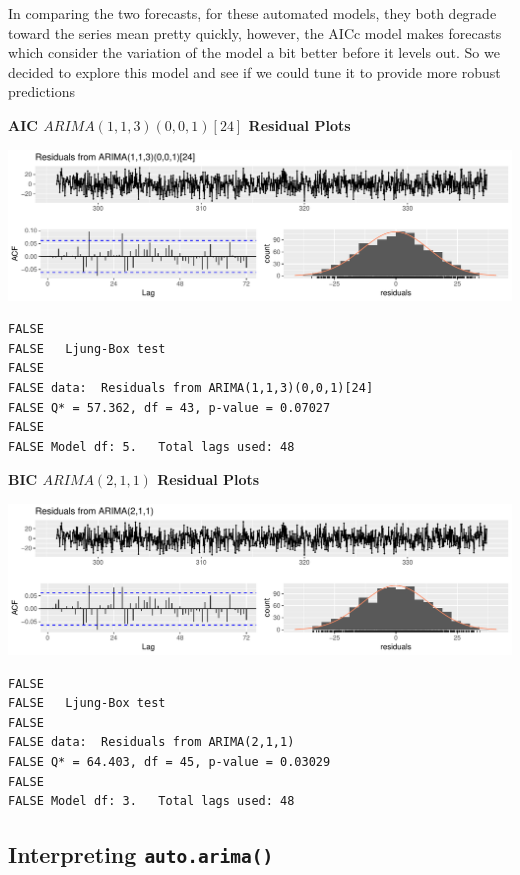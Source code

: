\documentclass[openany]{book}
\begin{document}
In comparing the two forecasts, for these automated models, they both
degrade toward the series mean pretty quickly, however, the AICc model
makes forecasts which consider the variation of the model a bit better
before it levels out. So we decided to explore this model and see if we
could tune it to provide more robust predictions

\textbf{AIC \(ARIMA(1,1,3)(0,0,1)[24]\) Residual Plots}

\includegraphics{Group2_Project1_Fall2019_files/figure-latex/unnamed-chunk-20-1.pdf}

\begin{verbatim}
FALSE 
FALSE   Ljung-Box test
FALSE 
FALSE data:  Residuals from ARIMA(1,1,3)(0,0,1)[24]
FALSE Q* = 57.362, df = 43, p-value = 0.07027
FALSE 
FALSE Model df: 5.   Total lags used: 48
\end{verbatim}

\textbf{BIC \(ARIMA(2,1,1)\) Residual Plots}

\includegraphics{Group2_Project1_Fall2019_files/figure-latex/unnamed-chunk-21-1.pdf}

\begin{verbatim}
FALSE 
FALSE   Ljung-Box test
FALSE 
FALSE data:  Residuals from ARIMA(2,1,1)
FALSE Q* = 64.403, df = 45, p-value = 0.03029
FALSE 
FALSE Model df: 3.   Total lags used: 48
\end{verbatim}

\hypertarget{interpreting-auto.arima}{%
\subsection{\texorpdfstring{Interpreting
\texttt{auto.arima()}}{Interpreting auto.arima()}}\label{interpreting-auto.arima}}
\end{document}
